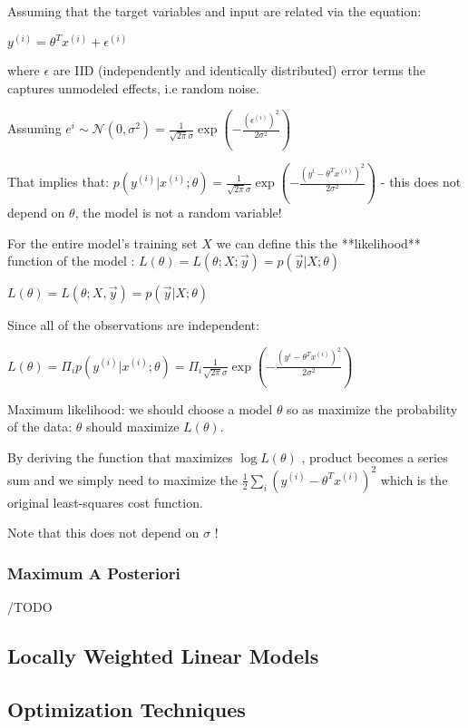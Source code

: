 {{{{Assuming that the target variables and input are related via the equation: 

$y^{(i)}=\theta^Tx^{(i)}+\epsilon^{(i)}$

where $\epsilon$ are IID (independently and identically distributed) error terms the captures unmodeled effects, i.e random noise.

Assuming $e^{i}\sim\mathcal{N}(0,\sigma^2)=\frac{1}{\sqrt{2\pi}\sigma}\exp\left(-\frac{(\epsilon^{(i)})^2}{2\sigma^2}\right)$

That implies that: $p(y^{(i)}|x^{(i)};\theta)=\frac{1}{\sqrt{2\pi}\sigma}\exp\left(-\frac{(y^{i}- \theta^Tx^{(i)})^2}{2\sigma^2}\right)$ - this does not depend on $\theta$, the model is not a random variable! 

For the entire model's training set $X$  we can define this the **likelihood** function of the model : $L(\theta)=L(\theta;X;\vec{y})=p(\vec{y}|X;\theta)$

$L(\theta) = L(\theta;X,\vec y) = p(\vec y| X;\theta)$

Since all of the observations are independent:

$L(\theta)= \Pi_{i} p(y^{(i)}| x^{(i)};\theta) = \Pi_{i} \frac{1}{\sqrt{2\pi}\sigma}\exp\left(-\frac{(y^{i}- \theta^Tx^{(i)})^2}{2\sigma^2}\right) $

Maximum likelihood: we should choose a model $\theta$ so as maximize the probability of the data: $\theta$ should maximize $L(\theta)$. 

By deriving the function that maximizes $\log L(\theta)$ , product becomes a series sum and we simply need to maximize the $\frac 1 2 \sum_i (y^{(i)}-\theta^T x^{(i)})^2$ which is the original least-squares cost function.

Note that this does not depend on $\sigma$ !

\subsubsection{Maximum A Posteriori}

/TODO

\subsection{Locally Weighted Linear Models}

\subsection{Optimization Techniques}

}}}}
